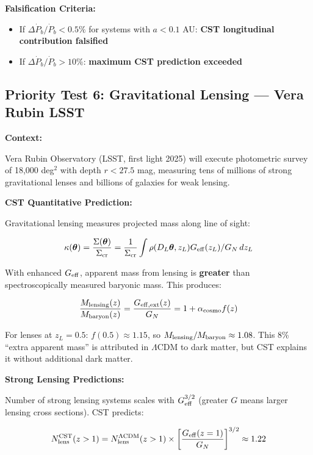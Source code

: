 \documentclass[11pt,a4paper]{article}
\providecommand{\tightlist}{\setlength{\itemsep}{0pt}\setlength{\parskip}{0pt}}
\begin{document}
\textbf{Falsification Criteria:}

\begin{itemize}
\tightlist
\item
  If \(\Delta\dot P_b/\dot P_b < 0.5\%\) for systems with \(a < 0.1\)
  AU: \textbf{CST longitudinal contribution falsified}
\item
  If \(\Delta\dot P_b/\dot P_b > 10\%\): \textbf{maximum CST prediction
  exceeded}
\end{itemize}

\hypertarget{priority-test-6-gravitational-lensing-vera-rubin-lsst}{%
\subsection{Priority Test 6: Gravitational Lensing --- Vera Rubin
LSST}\label{priority-test-6-gravitational-lensing-vera-rubin-lsst}}

\textbf{Context:}

Vera Rubin Observatory (LSST, first light 2025) will execute photometric
survey of 18,000 deg$^{2}$ with depth \(r < 27.5\) mag, measuring tens of
millions of strong gravitational lenses and billions of galaxies for
weak lensing.

\textbf{CST Quantitative Prediction:}

Gravitational lensing measures projected mass along line of sight:

\[\kappa(\boldsymbol\theta) = \frac{\Sigma(\boldsymbol\theta)}{\Sigma_{\rm cr}} = \frac{1}{\Sigma_{\rm cr}} \int \rho(D_L \boldsymbol\theta, z_L) G_{\rm eff}(z_L)/G_N \, dz_L\]

With enhanced \(G_{\rm eff}\), apparent mass from lensing is
\textbf{greater} than spectroscopically measured baryonic mass. This
produces:

\[\frac{M_{\rm lensing}(z)}{M_{\rm baryon}(z)} = \frac{G_{\rm eff,ext}(z)}{G_N} = 1 + \alpha_{\rm cosmo} f(z)\]

For lenses at \(z_L = 0.5\): \(f(0.5) \approx 1.15\), so
\(M_{\rm lensing}/M_{\rm baryon} \approx 1.08\). This 8\% ``extra
apparent mass'' is attributed in \(\Lambda\)CDM to dark matter, but CST
explains it without additional dark matter.

\textbf{Strong Lensing Predictions:}

Number of strong lensing systems scales with \(G_{\rm eff}^{3/2}\)
(greater \(G\) means larger lensing cross sections). CST predicts:

\[N_{\rm lens}^{\rm CST}(z > 1) = N_{\rm lens}^{\Lambda{\rm CDM}}(z > 1) \times \left[\frac{G_{\rm eff}(z=1)}{G_N}\right]^{3/2} \approx 1.22\]
\end{document}
